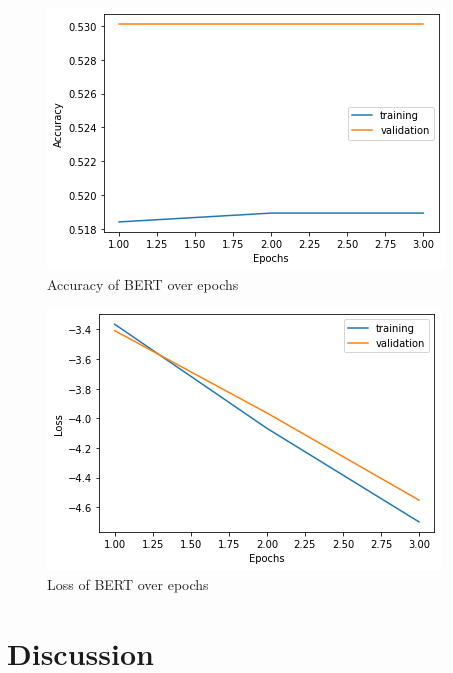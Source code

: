 \documentclass[11pt, a4paper]{article}
\begin{document}
\begin{figure}
    \centering
    \includegraphics[scale=0.5]{BERT_acc.png}
    \caption{Accuracy of BERT over epochs}
    \label{fig:BERT_acc}
\end{figure}
\begin{figure}
    \centering
    \includegraphics[scale=0.5]{BERT_Loss.png}
    \caption{Loss of BERT over epochs}
    \label{fig:BERT_Loss}
\end{figure}



\section{Discussion}
\end{document}
